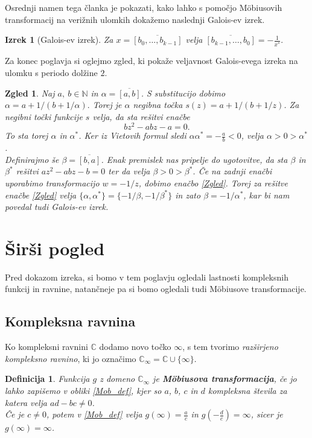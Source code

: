 \documentclass[a4paper,12pt]{article}
\def\N{\mathbb{N}} %
\def\C{\mathbb{C}} %
\def\Ci{\mathbb{C}_{\infty}} %
\newtheorem*{izrek}{Izrek}
\newtheorem{definicija}{Definicija}
\newtheorem{zgled}{Zgled}
\begin{document}
Osrednji namen tega članka je pokazati, kako lahko s pomočjo M\"obiusovih transformacij na verižnih ulomkih dokažemo naslednji Galois-ev izrek.

\begin{izrek}[Galois-ev izrek]
    \label{Galois}
	Za $x = \overline{[b_0, \ldots, b_{k-1}]}$ velja $\overline{[b_{k-1}, \ldots, b_0]} = - \frac{1}{x^*}.$
\end{izrek}

Za konec poglavja si oglejmo zgled, ki pokaže veljavnost Galois-evega izreka na ulomku s periodo dolžine $2$.

\begin{zgled}
Naj $a,\ b \in \N$ in $\alpha = \overline{[a, b]}$. S substitucijo dobimo $\alpha = a + 1/(b + 1/\alpha).$ Torej je $\alpha$ negibna točka $s(z) = a + 1/(b + 1/z)$. Za negibni točki funkcije $s$ velja, da sta rešitvi enačbe 
\begin{equation}
    \label{Zgled}
    bz^2 - abz - a = 0.
\end{equation}
To sta torej $\alpha$ in $\alpha^*$. Ker iz Vietovih formul sledi $\alpha\alpha^* = - \frac{a}{b} < 0$, velja $\alpha > 0 > \alpha^*$.\\
Definirajmo še $\beta = \overline{[b, a]}$. Enak premislek nas pripelje do ugotovitve, da sta $\beta$ in $\beta^*$ rešitvi $az^2 - abz - b =0$ ter da velja $\beta > 0 > \beta^*$. Če na zadnji enačbi uporabimo transformacijo $w = - 1 / z$, dobimo enačbo \eqref{Zgled}. Torej za rešitve enačbe \eqref{Zgled} velja $\{\alpha, \alpha^*\} = \{-1/\beta, -1/\beta^*\}$ in zato $\beta = -1/\alpha^*$, kar bi nam povedal tudi Galois-ev izrek.
\end{zgled}
\newpage


\section{Širši pogled}
\label{Pogled_pogl}

Pred dokazom izreka, si bomo v tem poglavju ogledali lastnosti kompleksnih funkcij in ravnine, natančneje pa si bomo ogledali tudi M\"obiusove transformacije.


\subsection{Kompleksna ravnina}
Ko kompleksni ravnini $\C$ dodamo novo točko $\infty$, s tem tvorimo \emph{razširjeno kompleksno ravnino}, ki jo označimo $\Ci = \C \cup \{\infty\}$.
\begin{definicija}
Funkcija $g$ z domeno $\Ci$ je \textbf{M\"obiusova transformacija}, če jo lahko zapišemo v obliki \eqref{Mob_def}, kjer so $a$, $b$, $c$ in $d$ kompleksna števila za katera velja $ad - bc \neq 0$. \\
Če je $c \neq 0$, potem v \eqref{Mob_def} velja $g(\infty) = \frac{a}{c}$ in $g(-\frac{d}{c}) = \infty$, sicer je $g(\infty) = \infty$.
\end{definicija}
\end{document}
